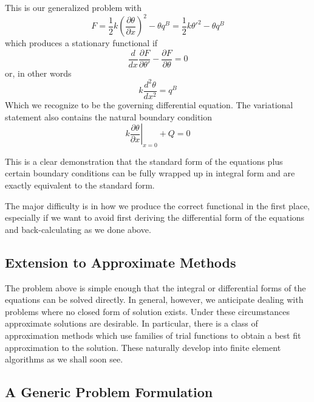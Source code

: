 \documentclass[10pt]{article}
\begin{document}
		This is our generalized problem with 
			\begin{equation}
					F = \frac{1}{2}k  \left(\frac{\partial \theta}{\partial x} \right)^2 - \theta q^B
						= \frac{1}{2}k {\theta'}^2 - \theta q^B
			\end{equation}
		which produces a stationary functional if
			\begin{equation}
					\frac{d}{dx}\frac{\partial F}{\partial \theta'} - \frac{\partial F}{\partial \theta} = 0	
			\end{equation}
		or, in other words
			\begin{equation}
				k\frac{d^2 \theta}{d x^2} = q^B	
			\end{equation}
		Which we recognize to be the governing differential equation. The variational
		statement also contains the natural boundary condition
			\begin{equation}
				 k \left. \frac{\partial \theta}{\partial x}	\right|_{x=0} + Q = 0
			\end{equation}
			
		This is a clear demonstration that the standard form of the equations plus
		certain boundary conditions can be fully wrapped up in integral form and  
		are exactly equivalent to the standard form.
		
		The major difficulty is in how we produce the correct functional in 
		the first place, especially if we want to avoid first deriving 
		the differential form of the equations
		and back-calculating as we done above.
					
		\subsection{Extension to Approximate Methods}	
	
		The problem above is simple enough that the integral or differential forms
		of the equations can be solved directly. In general, however, we anticipate
		dealing with problems where no closed form of solution exists. Under these
		circumstances approximate solutions are desirable. In particular, there
		is a class of approximation methods which use families of trial functions
		to obtain a best fit approximation to the solution. These naturally
		develop into finite element algorithms as we shall soon see.
		
	\subsection{A Generic Problem Formulation}
		
\end{document}
